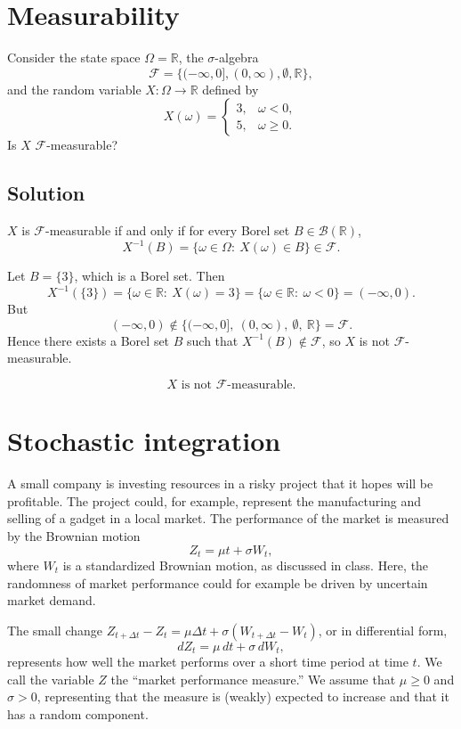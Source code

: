 \documentclass{article}
\begin{document}
\section{Measurability}

Consider the state space $\Omega=\mathbb{R}$, the $\sigma$-algebra
\[
\mathcal{F}=\{(-\infty,0],(0,\infty),\emptyset,\mathbb{R}\},
\]
and the random variable $X:\Omega\to\mathbb{R}$ defined by
\[
X(\omega)=
\begin{cases}
3, & \omega<0,\\
5, & \omega\ge 0.
\end{cases}
\]
Is $X$ $\mathcal{F}$-measurable?

\subsection*{Solution}
$X$ is $\mathcal F$-measurable if and only if for every Borel set $B\in\mathcal B(\mathbb R)$,
\[
X^{-1}(B)=\{\omega\in\Omega:\ X(\omega)\in B\}\in\mathcal F.
\]

\medskip

Let $B=\{3\}$, which is a Borel set. Then
\[
X^{-1}(\{3\})
=\{\omega\in\mathbb R:\ X(\omega)=3\}
=\{\omega\in\mathbb R:\ \omega<0\}
=(-\infty,0).
\]
But
\[
(-\infty,0)\notin \{(-\infty,0],\ (0,\infty),\ \emptyset,\ \mathbb R\}=\mathcal F.
\]
Hence there exists a Borel set $B$ such that $X^{-1}(B)\notin\mathcal F$, so $X$ is not $\mathcal F$-measurable.

\[
\boxed{\,X \text{ is not } \mathcal F\text{-measurable.}\,}
\]

\newpage
\section{Stochastic integration}

A small company is investing resources in a risky project that it hopes will be profitable. The project could, for example, represent the manufacturing and selling of a gadget in a local market. The performance of the market is measured by the Brownian motion
\[
Z_t=\mu t+\sigma W_t,
\]
where $W_t$ is a standardized Brownian motion, as discussed in class. Here, the randomness of market performance could for example be driven by uncertain market demand.

The small change $Z_{t+\Delta t}-Z_t=\mu\Delta t+\sigma(W_{t+\Delta t}-W_t)$, or in differential form,
\[
dZ_t=\mu\,dt+\sigma\,dW_t,
\]
represents how well the market performs over a short time period at time $t$. We call the variable $Z$ the ``market performance measure.'' We assume that $\mu\ge 0$ and $\sigma>0$, representing that the measure is (weakly) expected to increase and that it has a random component.
\end{document}
